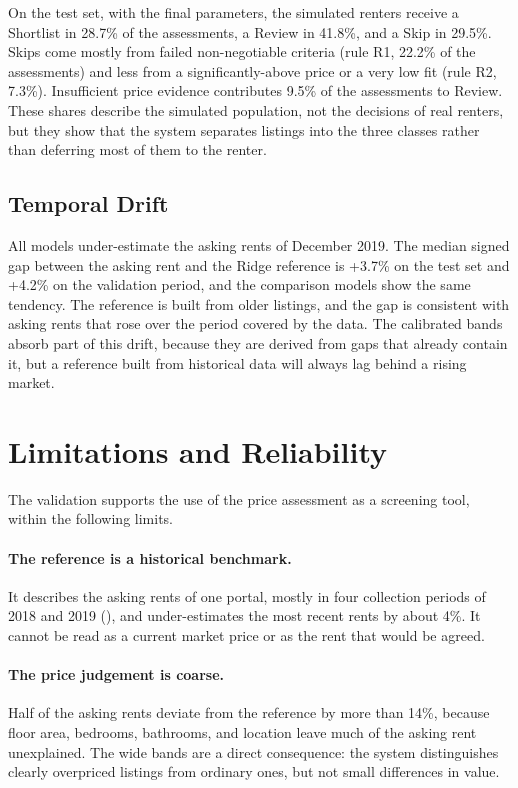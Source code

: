 \documentclass[12pt,a4paper]{report}
\begin{document}
On the test set, with the final parameters, the simulated renters receive a
Shortlist in 28.7\% of the assessments, a Review in 41.8\%, and a Skip in
29.5\%. Skips come mostly from failed non-negotiable criteria (rule R1,
22.2\% of the assessments) and less from a significantly-above price or a
very low fit (rule R2, 7.3\%). Insufficient price evidence contributes 9.5\%
of the assessments to Review. These shares describe the simulated
population, not the decisions of real renters, but they show that the
system separates listings into the three classes rather than deferring most
of them to the renter.

\subsection{Temporal Drift}

All models under-estimate the asking rents of December 2019. The median
signed gap between the asking rent and the Ridge reference is +3.7\% on the
test set and +4.2\% on the validation period, and the comparison models show
the same tendency. The reference is built from older listings, and the gap is
consistent with asking rents that rose over the period covered by the data. The calibrated bands absorb
part of this drift, because they are derived from gaps that already contain
it, but a reference built from historical data will always lag behind a
rising market.

\section{Limitations and Reliability}
\label{sec:limitations}

The validation supports the use of the price assessment as a screening tool,
within the following limits.

\paragraph{The reference is a historical benchmark.} It describes the asking
rents of one portal, mostly in four collection periods of 2018 and 2019
(), and under-estimates the most recent rents by
about 4\%. It cannot be read as a current market price or as the rent that
would be agreed.

\paragraph{The price judgement is coarse.} Half of the asking rents deviate
from the reference by more than 14\%, because floor area, bedrooms,
bathrooms, and location leave much of the asking rent unexplained. The wide
bands are a direct consequence: the system distinguishes clearly overpriced
listings from ordinary ones, but not small differences in value.
\end{document}
